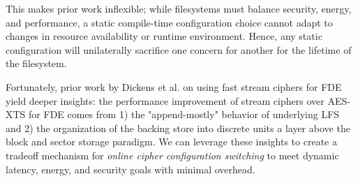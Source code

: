 This makes prior work inflexible; while filesystems must balance security,
energy, and performance, a static compile-time configuration choice cannot adapt
to changes in resource availability or runtime environment. Hence, any static
configuration will unilaterally sacrifice one concern for another for the
lifetime of the filesystem.

Fortunately, prior work by Dickens et al. on using fast stream ciphers for FDE
yield deeper insights: the performance improvement of stream ciphers over
AES-XTS for FDE comes from 1) the "append-mostly" behavior of underlying LFS and
2) the organization of the backing store into discrete units a layer above the
block and sector storage paradigm. We can leverage these insights to create a
tradeoff mechanism for \emph{online cipher configuration switching} to meet
dynamic latency, energy, and security goals with minimal overhead.




